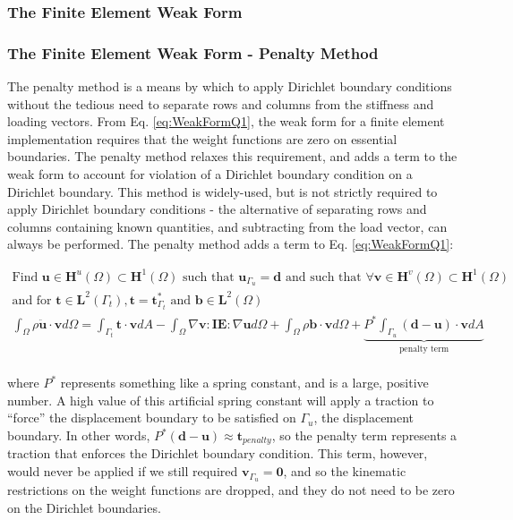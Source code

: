 \documentclass[10pt]{article}
\begin{document}
\subsubsection{The Finite Element Weak Form}

\subsubsection{The Finite Element Weak Form - Penalty Method}

The penalty method is a means by which to apply Dirichlet boundary conditions without the tedious need to separate rows and columns from the stiffness and loading vectors. From Eq. \eqref{eq:WeakFormQ1}, the weak form for a finite element implementation requires that the weight functions are zero on essential boundaries. The penalty method relaxes this requirement, and adds a term to the weak form to account for violation of a Dirichlet boundary condition on a Dirichlet boundary. This method is widely-used, but is not strictly required to apply Dirichlet boundary conditions - the alternative of separating rows and columns containing known quantities, and subtracting from the load vector, can always be performed. The penalty method adds a term to Eq. \eqref{eq:WeakFormQ1}:

\begin{equation}
\label{eq:WeakFormPenalty}
\begin{aligned}
\text{Find }\textbf{u}\in \textbf{H}^u(\Omega)\subset \textbf{H}^1(\Omega) \text{ such that } \textbf{u}_{\Gamma_u}=\textbf{d} \text{ and such that }\forall\textbf{v} \in \textbf{H}^v(\Omega)\subset \textbf{H}^1(\Omega)\\
\text{and for }\textbf{t}\in\textbf{L}^2(\Gamma_t), \textbf{t}=\textbf{t}^{*}_{\Gamma_t}\text{ and }\textbf{b}\in\textbf{L}^2(\Omega)\\
\int_{\Omega}\rho\ddot{\textbf{u}}\cdot \textbf{v}d\Omega=\int_{\Gamma_t}\textbf{t}\cdot\textbf{v}dA- \int_{\Omega}\nabla\textbf{v}:\textbf{IE}:\nabla\textbf{u}d\Omega +\int_{\Omega}\rho\textbf{b}\cdot\textbf{v}d\Omega+\underbrace{P^{*}\int_{\Gamma_u}(\textbf{d}-\textbf{u})\cdot\textbf{v}dA}_\text{penalty term}\\
\end{aligned}
\end{equation}

where \(P^{*}\) represents something like a spring constant, and is a large, positive number. A high value of this artificial spring constant will apply a traction to ``force'' the displacement boundary to be satisfied on \(\Gamma_u\), the displacement boundary. In other words, \(P^{*}(\textbf{d}-\textbf{u})\approx\textbf{t}_{penalty}\), so the penalty term represents a traction that enforces the Dirichlet boundary condition. This term, however, would never be applied if we still required \(\textbf{v}_{\Gamma_u}=\textbf{0}\), and so the kinematic restrictions on the weight functions are dropped, and they do not need to be zero on the Dirichlet boundaries.
\end{document}

